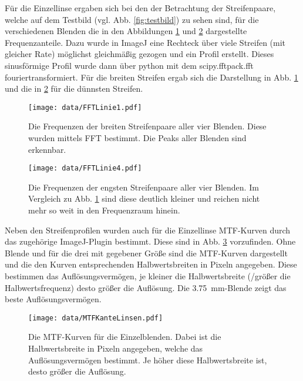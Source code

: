 			Für die Einzellinse ergaben sich bei den der Betrachtung der Streifenpaare, welche auf dem Testbild (vgl. Abb. \ref{fig:testbild}) zu sehen sind, für die verschiedenen Blenden die in den Abbildungen \ref{fig:FFT1} und \ref{fig:FFT2} dargestellte Frequenzanteile.
			Dazu wurde in ImageJ eine Rechteck über viele Streifen (mit gleicher Rate) möglichst gleichmäßig gezogen und ein Profil erstellt.
			Dieses sinusförmige Profil wurde dann über python mit dem scipy.fftpack.fft fouriertransformiert.
			Für die breiten Streifen ergab sich die Darstellung in Abb. \ref{fig:FFT1} und die in \ref{fig:FFT2} für die dünnsten Streifen.			
			\begin{figure}[ht]
				\centering
				\texttt{[image: data/FFTLinie1.pdf]}
				\caption{Die Frequenzen der breiten Streifenpaare aller vier Blenden. Diese wurden mittels FFT bestimmt. Die Peaks aller Blenden sind erkennbar.}
				\label{fig:FFT1}
			\end{figure}		
			\begin{figure}[ht]
				\centering
				\texttt{[image: data/FFTLinie4.pdf]}
				\caption{Die Frequenzen der engsten Streifenpaare aller vier Blenden. Im Vergleich zu Abb. \ref{fig:FFT1} sind diese deutlich kleiner und reichen nicht mehr so weit in den Frequenzraum hinein.}
				\label{fig:FFT2}	
			\end{figure}
			
			Neben den Streifenprofilen wurden auch für die Einzellinse MTF-Kurven durch das zugehörige ImageJ-Plugin bestimmt.
			Diese sind in Abb. \ref{fig:MTF} vorzufinden.
			Ohne Blende und für die drei mit gegebener Größe sind die MTF-Kurven dargestellt und die den Kurven entsprechenden Halbwertsbreiten in Pixeln angegeben.
			Diese bestimmen das Auflösungsvermögen, je kleiner die Halbwertsbreite (/größer die Halbwertsfrequenz) desto größer die Auflösung.
			Die \SI{3.75}{\milli\meter}-Blende zeigt das beste Auflösungsvermögen.
			\begin{figure}[ht]
				\centering
				\texttt{[image: data/MTFKanteLinsen.pdf]}
				\caption{Die MTF-Kurven für die Einzelblenden. Dabei ist die Halbwertsbreite in Pixeln angegeben, welche das Auflösungsvermögen bestimmt. Je höher diese Halbwertsbreite ist, desto größer die Auflösung.}
				\label{fig:MTF}	
			\end{figure}
			
